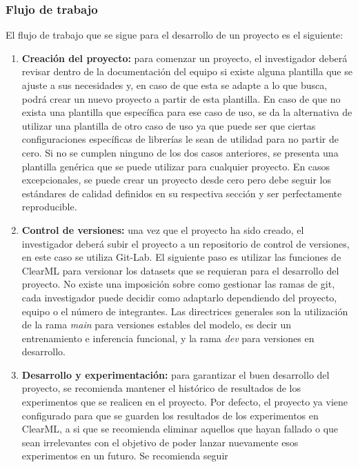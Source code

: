 \subsubsection{Flujo de trabajo}
El flujo de trabajo que se sigue para el desarrollo de un proyecto
es el siguiente:
\begin{enumerate}
    \item \textbf{Creación del proyecto:} para comenzar un proyecto, el
    investigador deberá revisar dentro de la documentación del equipo
    si existe alguna plantilla que se ajuste a sus necesidades y, en caso
    de que esta se adapte a lo que busca, podrá crear un nuevo proyecto
    a partir de esta plantilla. En caso de que no exista una plantilla
    que específica para ese caso de uso, se da la alternativa de utilizar
    una plantilla de otro caso de uso ya que puede ser que ciertas configuraciones
    específicas de librerías le sean de utilidad para no partir de cero.
    Si no se cumplen ninguno de los dos casos anteriores, se presenta una
    plantilla genérica que se puede utilizar para cualquier proyecto. En casos
    excepcionales, se puede crear un proyecto desde cero pero debe seguir los
    estándares de calidad definidos en su respectiva sección y ser perfectamente
    reproducible.
    \item \textbf{Control de versiones:} una vez que el proyecto ha sido creado,
    el investigador deberá subir el proyecto a un repositorio de control de versiones,
    en este caso se utiliza Git-Lab. El siguiente paso es utilizar las funciones de 
    ClearML para versionar los datasets que se requieran para el desarrollo del proyecto.
    No existe una imposición sobre como gestionar las ramas de git, cada investigador
    puede decidir como adaptarlo dependiendo del proyecto, equipo o el número de integrantes.
    Las directrices generales son la utilización de la rama \textit{main} para versiones
    estables del modelo, es decir un entrenamiento e inferencia funcional, y la rama 
    \textit{dev} para versiones en desarrollo.
    \item \textbf{Desarrollo y experimentación:} para garantizar el buen desarrollo del proyecto, se
    recomienda mantener el histórico de resultados de los experimentos que se realicen
    en el proyecto. Por defecto, el proyecto ya viene configurado para que se guarden
    los resultados de los experimentos en ClearML, a si que se recomienda eliminar 
    aquellos que hayan fallado o que sean irrelevantes con el objetivo de poder
    lanzar nuevamente esos experimentos en un futuro. Se recomienda seguir

\end{enumerate}
